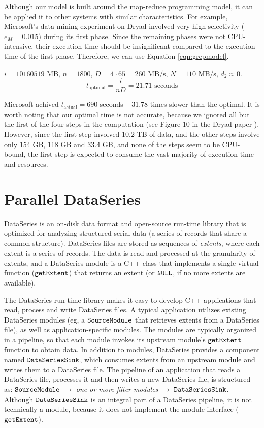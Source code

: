 \documentclass{acm_proc_article-sp}
\begin{document}
Although our model is built around the map-reduce programming model, it can be
applied it to other systems with similar characteristics. For example,
Microsoft's data mining experiment on Dryad \cite{dryad} involved very high
selectivity ($e_M = 0.015$) during its first phase. Since the remaining phases
were not CPU-intensive, their execution time should be insignificant compared to
the execution time of the first phase. Therefore, we can use Equation
\ref{eqn:grepmodel}.

$i = 10160519 \text{ MB}$, $n = 1800$, $D = 4 \cdot 65 = 260 \text{ MB/s}$, $N
= 110 \text{ MB/s}$, $d_2 \approx 0$. \[t_\text{optimal} = \frac{i}{n D} =
21.71 \text{ seconds}\]

Microsoft achived $t_\text{actual} = 690$ seconds -- 31.78 times slower than
the optimal. It is worth noting that our optimal time is not accurate, because
we ignored all but the first of the four steps in the computation (see Figure
10 in the Dryad paper \cite{dryad}). However, since the first step involved
10.2 TB of data, and the other steps involve only 154 GB, 118 GB and 33.4 GB,
and none of the steps seem to be CPU-bound, the first step is expected to
consume the vast majority of execution time and resources.

\section{Parallel DataSeries}

DataSeries \cite{dataseries} is an on-disk data format and open-source run-time
library that is optimized for analyzing structured serial data (a series of
records that share a common structure). DataSeries files are stored as
sequences of \emph{extents}, where each extent is a series of records.
The data is read and processed at the granularity of extents, and a DataSeries
module is a C++ class that implements a single virtual function ($\tt
getExtent$) that returns an extent (or $\tt NULL$, if no more extents
are available).

The DataSeries run-time library makes it easy to develop C++ applications that
read, process and write DataSeries files. A typical application utilizes existing
DataSeries modules (eg, a $\tt SourceModule$ that retrieves extents from a
DataSeries file), as well as application-specific modules. The modules are
typically organized in a pipeline, so that each module invokes its upstream
module's $\tt getExtent$ function to obtain data. In addition to modules,
DataSeries provides a component named $\tt DataSeriesSink$, which consumes
extents from an upstream module and writes them to a DataSeries file. The
pipeline of an application that reads a DataSeries file, processes it and then
writes a new DataSeries file, is structured as: $\tt SourceModule$ $\to$
\emph{one or more filter modules} $\to$ $\tt DataSeriesSink$. Although $\tt DataSeriesSink$
is an integral part of a DataSeries pipeline, it is not technically a module,
because it does not implement the module interface ($\tt getExtent$).
\end{document}
